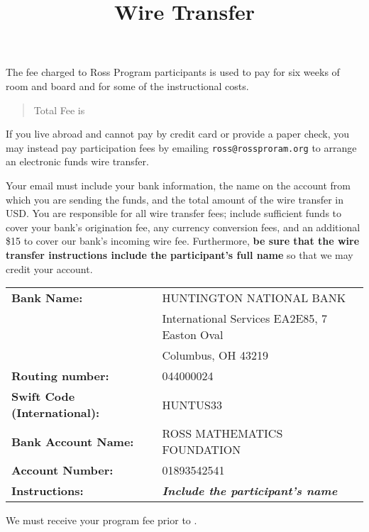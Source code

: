\documentclass[11pt]{ross}
\title{Wire Transfer}
\begin{document}
\maketitle

The fee charged to Ross Program participants is used to pay for six
weeks of room and board and for some of the instructional costs.
\begin{quote}
Total Fee is \totalfee
\end{quote}

If you live abroad and cannot pay by credit card or provide a paper
check, you may instead pay participation fees by emailing
\texttt{ross@rossproram.org} to arrange an electronic funds wire
transfer.

Your email must include your bank information, the name on the account
from which you are sending the funds, and the total amount of the wire
transfer in USD.  You are responsible for all wire transfer fees;
include sufficient funds to cover your bank's origination fee, any
currency conversion fees, and an additional \$15 to cover our bank's
incoming wire fee.  Furthermore, \textbf{be sure that the wire
  transfer instructions include the participant's full name} so that
we may credit your account.

\begin{tabular}{ll}
  \textbf{Bank Name:} &  HUNTINGTON NATIONAL BANK \\
&  International Services EA2E85, 7 Easton Oval \\
&  Columbus, OH 43219   \\
\textbf{Routing number:} &  044000024 \\
\textbf{Swift Code (International):} & HUNTUS33 \\
\textbf{Bank Account Name:} & ROSS MATHEMATICS FOUNDATION \\
\textbf{Account Number:} &  01893542541 \\
  \textbf{Instructions:} &  \textit{\textbf{Include the participant's name}} \\
\end{tabular}

We must receive your program fee prior to \feedduedate.
\end{document}
